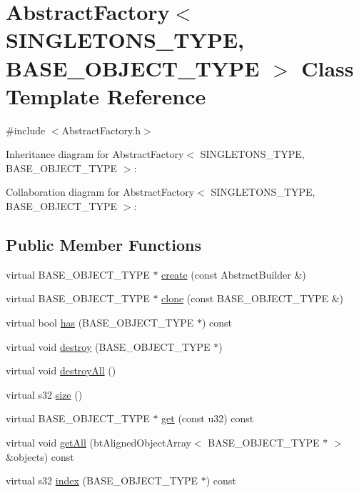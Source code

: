 \hypertarget{class_abstract_factory}{\section{Abstract\+Factory$<$ S\+I\+N\+G\+L\+E\+T\+O\+N\+S\+\_\+\+T\+Y\+P\+E, B\+A\+S\+E\+\_\+\+O\+B\+J\+E\+C\+T\+\_\+\+T\+Y\+P\+E $>$ Class Template Reference}
\label{class_abstract_factory}
}


{\ttfamily \#include $<$Abstract\+Factory.\+h$>$}



Inheritance diagram for Abstract\+Factory$<$ S\+I\+N\+G\+L\+E\+T\+O\+N\+S\+\_\+\+T\+Y\+P\+E, B\+A\+S\+E\+\_\+\+O\+B\+J\+E\+C\+T\+\_\+\+T\+Y\+P\+E $>$\+:


Collaboration diagram for Abstract\+Factory$<$ S\+I\+N\+G\+L\+E\+T\+O\+N\+S\+\_\+\+T\+Y\+P\+E, B\+A\+S\+E\+\_\+\+O\+B\+J\+E\+C\+T\+\_\+\+T\+Y\+P\+E $>$\+:
\subsection*{Public Member Functions}
\begin{DoxyCompactItemize}
\item 
virtual B\+A\+S\+E\+\_\+\+O\+B\+J\+E\+C\+T\+\_\+\+T\+Y\+P\+E $\ast$ \hyperlink{class_abstract_factory_a74042c2c11faf58dd335d4c31d1e54cc}{create} (const Abstract\+Builder \&)
\item 
virtual B\+A\+S\+E\+\_\+\+O\+B\+J\+E\+C\+T\+\_\+\+T\+Y\+P\+E $\ast$ \hyperlink{class_abstract_factory_a88519ee00d60e1342bf3a0dcbb6dfe76}{clone} (const B\+A\+S\+E\+\_\+\+O\+B\+J\+E\+C\+T\+\_\+\+T\+Y\+P\+E \&)
\item 
virtual bool \hyperlink{class_abstract_factory_af92afeeb7fe0e9869f93f51f19b317f7}{has} (B\+A\+S\+E\+\_\+\+O\+B\+J\+E\+C\+T\+\_\+\+T\+Y\+P\+E $\ast$) const 
\item 
virtual void \hyperlink{class_abstract_factory_ab8b44e874d336d38f17b5c1287843db2}{destroy} (B\+A\+S\+E\+\_\+\+O\+B\+J\+E\+C\+T\+\_\+\+T\+Y\+P\+E $\ast$)
\item 
virtual void \hyperlink{class_abstract_factory_a099a2afe22d8325769acd22632de7663}{destroy\+All} ()
\item 
virtual s32 \hyperlink{class_abstract_factory_af389b821cd2210c582d0bbf0d542fd72}{size} ()
\item 
virtual B\+A\+S\+E\+\_\+\+O\+B\+J\+E\+C\+T\+\_\+\+T\+Y\+P\+E $\ast$ \hyperlink{class_abstract_factory_a2125d28a3475d4b5d53ff3ead831a21e}{get} (const u32) const 
\item 
virtual void \hyperlink{class_abstract_factory_aa51318b4584720574aa6acfd1799a85b}{get\+All} (bt\+Aligned\+Object\+Array$<$ B\+A\+S\+E\+\_\+\+O\+B\+J\+E\+C\+T\+\_\+\+T\+Y\+P\+E $\ast$ $>$ \&objects) const 
\item 
virtual s32 \hyperlink{class_abstract_factory_aea7ed1cbbf8b81a68f708635fdd03cf6}{index} (B\+A\+S\+E\+\_\+\+O\+B\+J\+E\+C\+T\+\_\+\+T\+Y\+P\+E $\ast$) const 
\end{DoxyCompactItemize}
